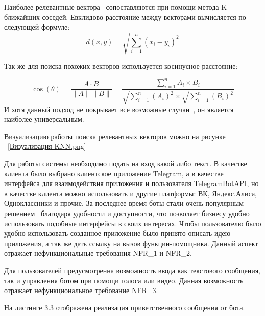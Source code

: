 
Наиболее релевантные вектора~\cite{vec} сопоставляются при помощи метода K-ближайших 
соседей. Евклидово расстояние между векторами вычисляется по следующей формуле:\\
\[
    d(x,y)=\sqrt{\sum_{i=1}^{n}{(x_i-y_i)}^2}
\]

Так же для поиска похожих векторов используется косинусное расстояние:

\[
    \cos(\theta) = \frac{A \cdot B}{\| A\| \|B\|} = 
    \frac{\sum_{i=1}^{n}A_i \times B_i}{\sqrt{\sum_{i=1}^{n}(A_i)^2}
    \times \sqrt{\sum_{i=1}^{n}(B_i)^2}}
\]
И хотя данный подход не покрывает все возможные случаи~\cite{leven}, он
является наиболее универсальным.

Визуализацию работы поиска релевантных векторов можно на рисунке
~\ref{Визуализация KNN.png}


Для работы системы необходимо подать на вход какой либо текст.
В качестве клиента было выбрано клиентское приложение Telegram, а в качестве
интерфейса для взаимодействия приложения и пользователя TelegramBotAPI, но
в качестве клиента можно использовать и другие платформы: ВК, Яндекс.Алиса,
Одноклассники и прочие. За последнее время боты стали очень популярным
решением~\cite{bots} благодаря удобности и доступности, что позволяет
бизнесу удобно использовать подобные интерфейсы в своих интересах.
Чтобы пользователю было удобно использовать созданное приложение было
принято описать идею приложения, а так же дать ссылку на вызов
функции-помощника. Данный аспект отражает нефункциональные требования
NFR\_1 и NFR\_2.

Для пользователей предусмотренна возможность ввода как текстового сообщения,
так и управления ботом при помощи голоса или видео. Данная возможность
отражает нефункциональное требование NFR\_3.

На листинге 3.3 отображена реализация приветственного сообщения от бота.


